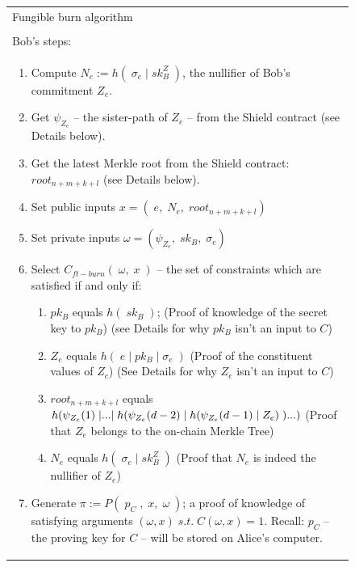 \documentclass{article}
\newcounter{ongoingEnumCounter}%
\DeclarePairedDelimiter\br{(}{)}
\begin{document}
\newpage
\begin{figure}[H]
  \ContinuedFloat*
	\begin{center}
		\begin{framed}
      \begin{tabular}{p{16cm}}
        Fungible burn algorithm \\
        \\
        \hline
        Bob's steps:\\
        \begin{enumerate}
          \setcounter{enumi}{\value{ongoingEnumCounter}}
          \item Compute $N_e := h(\;\sigma_e\;|\;sk^Z_B\;)$, the nullifier of Bob's commitment $Z_e$.
          \item Get $\psi_{Z_e}$ -- the sister-path of $Z_e$ -- from the Shield contract (see Details below).
          \item Get the latest Merkle root from the Shield contract: $root_{n+m+k+l}$ (see Details below).
          \item Set public inputs $x = (\;e,\;N_e,\;root_{n+m+k+l})$
          \item Set private inputs $\omega = (\psi_{Z_e},\;sk_B,\;\sigma_e)$
          \item Select $C_{ft-burn}(\;\omega,\;x\;)$ -- the set of constraints which are satisfied if and only if:
          \begin{enumerate}
            \item $pk_B$ equals $h(\;sk_B\;)$; (Proof of knowledge of the secret key to $pk_B$) (see Details for why $pk_B$ isn't an input to $C$)
            \item $Z_e$ equals $h(\;e\;|\;pk_B\;|\;\sigma_e\;)$ (Proof of the constituent values of $Z_c$)
            (See Details for why $Z_e$ isn't an input to $C$)
            \item $root_{n+m+k+l}$ equals $h\br*{\psi_{Z_e}(1)\;|...|\;h\br*{\psi_{Z_e}(d-2)\;|\;h\br*{\psi_{Z_e}(d-1)\;|\;Z_e}\;}...}$ (Proof that $Z_e$ belongs to the on-chain Merkle Tree)
            \item $N_e$ equals $h(\;\sigma_e\;|\;sk^Z_B\;)$ (Proof that $N_e$ is indeed the nullifier of $Z_e$)
          \end{enumerate}
          \item Generate $\pi := P(\;p_C\;,\;x,\;\omega\;)$; a proof of knowledge of satisfying arguments $(\omega, x)\;s.t.\;C(\omega, x) = 1$. Recall: $p_C$ -- the proving key for $C$ -- will be stored on Alice's computer.


\end{enumerate}
\end{tabular}
\end{framed}
\end{center}
\end{figure}
\end{document}
